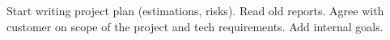 \nextItem Start writing project plan (estimations, risks). 
\nextItem Read old reports.
\nextItem Agree with customer on scope of the project and tech requirements.
\nextItem Add internal goals. 
